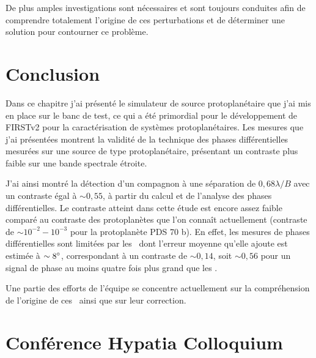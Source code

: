 De plus amples investigations sont nécessaires et sont toujours conduites afin de comprendre totalement l'origine de ces perturbations et de déterminer une solution pour contourner ce problème.


\section{Conclusion}

Dans ce chapitre j'ai présenté le simulateur de source protoplanétaire que j'ai mis en place sur le banc de test, ce qui a été primordial pour le développement de \ac{FIRSTv2} pour la caractérisation de systèmes protoplanétaires. Les mesures que j'ai présentées montrent la validité de la technique des phases différentielles mesurées sur une source de type protoplanétaire, présentant un contraste plus faible sur une bande spectrale étroite.

J'ai ainsi montré la détection d'un compagnon à une séparation de $0,68 \lambda / B$ avec un contraste égal à $\sim 0,55$, à partir du calcul et de l'analyse des phases différentielles. Le contraste atteint dans cette étude est encore assez faible comparé au contraste des protoplanètes que l'on connaît actuellement (contraste de $\sim 10^{-2} - 10^{-3}$ pour la protoplanète PDS 70 b). En effet, les mesures de phases différentielles sont limitées par les \wiggles~dont l'erreur moyenne qu'elle ajoute est estimée à $\sim 8^{\circ}$, correspondant à un contraste de $\sim 0,14$, soit $\sim 0,56$ pour un signal de phase au moins quatre fois plus grand que les \wiggles.

Une partie des efforts de l'équipe se concentre actuellement sur la compréhension de l'origine de ces \wiggles~ainsi que sur leur correction.


\clearpage
\section*{Conférence Hypatia Colloquium}
\label{sec:HypatiaProceeding}
{}

\clearpage


